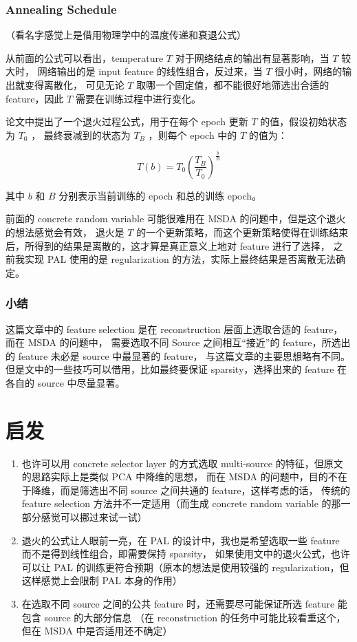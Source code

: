 \documentclass[UTF8]{ctexart}
\begin{document}
            \subsubsection{Annealing Schedule}
                （看名字感觉上是借用物理学中的温度传递和衰退公式）

                从前面的公式可以看出，temperature $T$ 对于网络结点的输出有显著影响，当 $T$ 较大时，
                网络输出的是 input feature 的线性组合，反过来，当 $T$ 很小时，网络的输出就变得离散化，
                可见无论 $T$ 取哪一个固定值，都不能很好地筛选出合适的 feature，因此 $T$ 需要在训练过程中进行变化。

                论文中提出了一个退火过程公式，用于在每个 epoch 更新 $T$ 的值，假设初始状态为 $T_0$ ，
                最终衰减到的状态为 $T_B$ ，则每个 epoch 中的 $T$ 的值为：

                $$
                    T(b) = T_0(\frac{T_B}{T_0})^{\frac{b}{B}}
                $$

                其中 $b$ 和 $B$ 分别表示当前训练的 epoch 和总的训练 epoch。

                前面的 concrete random variable 可能很难用在 MSDA 的问题中，但是这个退火的想法感觉会有效，
                退火是 $T$ 的一个更新策略，而这个更新策略使得在训练结束后，所得到的结果是离散的，这才算是真正意义上地对 feature 进行了选择，
                之前我实现 PAL 使用的是 regularization 的方法，实际上最终结果是否离散无法确定。
            \subsubsection{小结}
                这篇文章中的 feature selection 是在 reconstruction 层面上选取合适的 feature，而在 MSDA 的问题中，
                需要选取不同 Source 之间相互“接近”的 feature，所选出的 feature 未必是 source 中最显著的 feature，
                与这篇文章的主要思想略有不同。但是文中的一些技巧可以借用，比如最终要保证 sparsity，选择出来的 feature 在各自的 source 中尽量显著。
    \section{启发}
        \begin{enumerate}
            \item 也许可以用 concrete selector layer 的方式选取 multi-source 的特征，但原文的思路实际上是类似 PCA 中降维的思想，
                而在 MSDA 的问题中，目的不在于降维，而是筛选出不同 source 之间共通的 feature，这样考虑的话，
                传统的 feature selection 方法并不一定适用（而生成 concrete random variable 的那一部分感觉可以挪过来试一试）
            \item 退火的公式让人眼前一亮，在 PAL 的设计中，我也是希望选取一些 feature 而不是得到线性组合，即需要保持 sparsity，
                如果使用文中的退火公式，也许可以让 PAL 的训练更符合预期（原本的想法是使用较强的 regularization，但这样感觉上会限制 PAL 本身的作用）
            \item 在选取不同 source 之间的公共 feature 时，还需要尽可能保证所选 feature 能包含 source 的大部分信息
                （在 reconstruction 的任务中可能比较看重这个，但在 MSDA 中是否适用还不确定）
        \end{enumerate}
\end{document}
